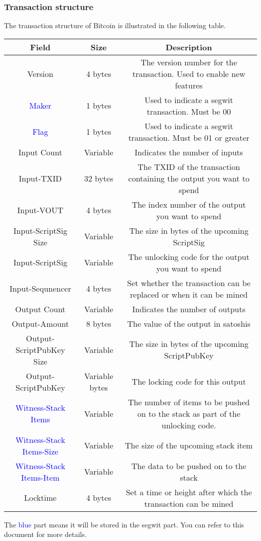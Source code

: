 \subsubsection{Transaction structure}

The transaction structure of Bitcoin is illustrated in the following table. \newline

\begin{tabular}{|c|c|c|} \hline
    Field & Size & Description \\ \hline
    Version & 4 bytes & The version number for the transaction. Used to enable new features  \\ \hline
    \textcolor{blue}{Maker} & 1 bytes & Used to indicate a segwit transaction. Must be 00 \\ \hline
    \textcolor{blue}{Flag} & 1 bytes & Used to indicate a segwit transaction. Must be 01 or greater  \\ \hline
    Input Count & Variable & Indicates the number of inputs  \\ \hline
    Input-TXID & 32 bytes & The TXID of the transaction containing the output you want to spend  \\ \hline
    Input-VOUT & 4 bytes & The index number of the output you want to spend  \\ \hline
    Input-ScriptSig Size & Variable & The size in bytes of the upcoming ScriptSig  \\ \hline
    Input-ScriptSig & Variable & The unlocking code for the output you want to spend  \\ \hline
    Input-Sequnencer & 4 bytes & Set whether the transaction can be replaced or when it can be mined  \\ \hline
    Output Count & Variable & Indicates the number of outputs  \\ \hline
    Output-Amount & 8 bytes & The value of the output in satoshis  \\ \hline
    Output-ScriptPubKey Size & Variable & The size in bytes of the upcoming ScriptPubKey  \\ \hline
    Output-ScriptPubKey & Variable bytes & The locking code for this output  \\ \hline
    \textcolor{blue}{Witness-Stack Items} & Variable & The number of items to be pushed on to the stack as part of the unlocking code.  \\ \hline
    \textcolor{blue}{Witness-Stack Items-Size} & Variable & The size of the upcoming stack item  \\ \hline
    \textcolor{blue}{Witness-Stack Items-Item} & Variable & The data to be pushed on to the stack  \\ \hline
    Locktime & 4 bytes & Set a time or height after which the transaction can be mined  \\ \hline
\end{tabular}
\newline
\newline
\indent The \textcolor{blue}{blue} part means it will be stored in the segwit part. You can refer to this document \cite{website:transaction-structure} for more details. 
